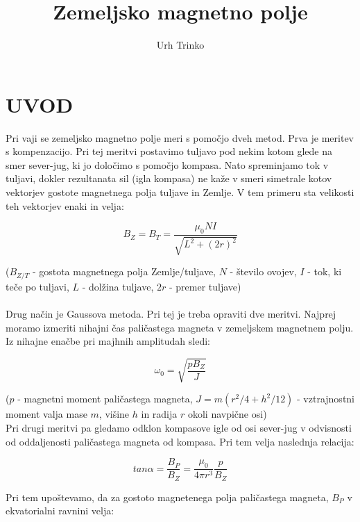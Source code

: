 \documentclass[12pt,a4paper]{article}
\begin{document}
\title{Zemeljsko magnetno polje}
\author{Urh Trinko}
\maketitle

\newpage


\section{UVOD}

Pri vaji se zemeljsko magnetno polje meri s pomo\v cjo dveh metod. Prva je meritev s kompenzacijo. Pri tej meritvi postavimo tuljavo pod nekim kotom glede na smer sever-jug, ki jo dolo\v cimo s pomo\v cjo kompasa. Nato spreminjamo tok v tuljavi, dokler rezultanata sil (igla kompasa) ne ka\v ze v smeri simetrale kotov vektorjev gostote magnetnega polja tuljave in Zemlje. V tem primeru sta velikosti teh vektorjev enaki in  velja:

\begin{equation}
	{B_{Z} = B_{T} = \frac{\mu_0 N I}{\sqrt{L^{2} + (2r)^2}}} 
\end{equation}

($B_{Z/T}$ - gostota magnetnega polja Zemlje/tuljave, $N$ - \v stevilo ovojev, $I$ - tok, ki te\v ce po tuljavi, $L$ - dol\v zina tuljave, $2r$ - premer tuljave)
\\
\\
Drug na\v cin je Gaussova metoda. Pri tej je treba opraviti dve meritvi. Najprej moramo izmeriti nihajni \v cas pali\v castega magneta v zemeljskem magnetnem polju. Iz nihajne ena\v cbe pri majhnih amplitudah sledi:

\begin{equation}
	{\omega_0 = \sqrt{\frac{p B_{Z}}{J}}} 
\end{equation}

($p$ - magnetni moment pali\v castega magneta, $J = m(r^2 / 4 + h^2 / 12)$ - vztrajnostni moment valja mase $m$, vi\v sine $h$ in radija $r$ okoli navpi\v cne osi)
\\
Pri drugi meritvi pa gledamo odklon kompasove igle od osi sever-jug v odvisnosti od oddaljenosti pali\v castega magneta od kompasa. Pri tem velja naslednja relacija:

\begin{equation}
	{tan \alpha = \frac{B_{P}}{B_{Z}} = \frac{\mu_0}{4 \pi r^3} \frac{p}{B_{Z}}}
\end{equation}

Pri tem upo\v stevamo, da za gostoto magnetenega polja pali\v castega magneta, $B_{P}$ v ekvatorialni ravnini velja:
\end{document}
